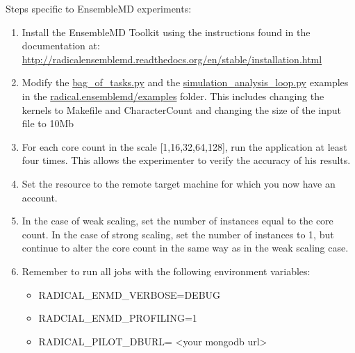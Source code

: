 \documentclass[]{article}
\begin{document}
		Steps specific to EnsembleMD experiments:
		\begin{enumerate}
			\item Install the EnsembleMD Toolkit using the instructions found in the documentation at: \\
				  \url{http://radicalensemblemd.readthedocs.org/en/stable/installation.html}
			\item Modify the \url{bag_of_tasks.py} and the \url{simulation_analysis_loop.py} examples in the \url{radical.ensemblemd/examples} folder. This includes changing the kernels to Makefile and CharacterCount and changing the size of the input file to 10Mb
			\item For each core count in the scale [1,16,32,64,128], run the application at least four times. This allows the experimenter to verify the accuracy of his results.
			\item Set the resource to the remote target machine for which you now have an account.
			\item In the case of weak scaling, set the number of instances equal to the core count. In the case of strong scaling, set the number of instances to 1, but continue to alter the core count in the same way as in the weak scaling case.
			\item Remember to run all jobs with the following environment variables:
				\begin{itemize}
					\item RADICAL\_ENMD\_VERBOSE=DEBUG
					\item RADCIAL\_ENMD\_PROFILING=1
					\item RADICAL\_PILOT\_DBURL= <your mongodb url>
				\end{itemize}
		\end{enumerate}
\end{document}
